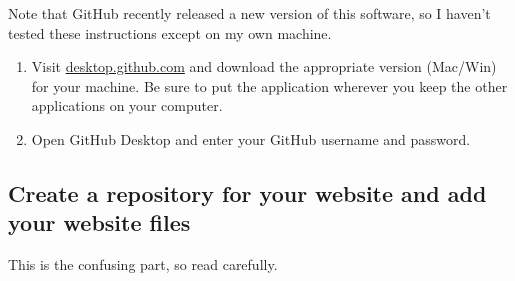 \documentclass[]{book}
\providecommand{\tightlist}{%
  \setlength{\itemsep}{0pt}\setlength{\parskip}{0pt}}
\theoremstyle{definition}
\theoremstyle{definition}
\theoremstyle{definition}
\theoremstyle{remark}
\begin{document}
Note that GitHub recently released a new version of this software, so I
haven't tested these instructions except on my own machine.

\begin{enumerate}
\def\labelenumi{\arabic{enumi}.}
\tightlist
\item
  Visit \href{https://desktop.github.com/}{desktop.github.com} and
  download the appropriate version (Mac/Win) for your machine. Be sure
  to put the application wherever you keep the other applications on
  your computer.
\item
  Open GitHub Desktop and enter your GitHub username and password.
\end{enumerate}

\hypertarget{create-a-repository-for-your-website-and-add-your-website-files}{%
\subsection{Create a repository for your website and add your website
files}\label{create-a-repository-for-your-website-and-add-your-website-files}}

This is the confusing part, so read carefully.
\end{document}
